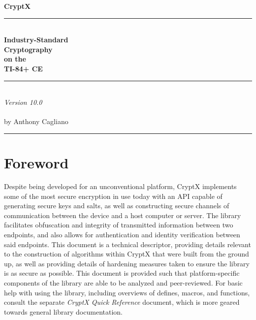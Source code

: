 \documentclass[titlepage]{article}
\begin{document}
	
			\begin{titlepage}
			\begin{center}
				\vspace*{2in}
				{\Large\textbf{CryptX}}
				\\\rule{.5\linewidth}{4px}\\
				{\huge\textbf{Industry-Standard\\Cryptography\\on the\\\vspace{4mm}TI-84+ CE}}
				\\\rule{.5\linewidth}{4px}\\\vspace{4mm}
				{\large\textit{Version 10.0}}\\\vspace{4mm}{\Large Analysis \& Extended Information}\\
				\vspace*{2in}
				by Anthony Cagliano
			\end{center}
		\end{titlepage}
	\setcounter{secnumdepth}{2}
	\setcounter{tocdepth}{2}
	\tableofcontents
	\begin{center}
		\rule{1\linewidth}{2px}
	\end{center}
	\section*{Foreword}
		Despite being developed for an unconventional platform, CryptX implements some of the most secure encryption in use today with an API capable of generating secure keys and salts, as well as constructing secure channels of communication between the device and a host computer or server. The library facilitates obfuscation and integrity of transmitted information between two endpoints, and also allows for authentication and identity verification between said endpoints. This document is a technical descriptor, providing details relevant to the construction of algorithms within CryptX that were built from the ground up, as well as providing details of hardening measures taken to ensure the library is as secure as possible. This document is provided such that platform-specific components of the library are able to be analyzed and peer-reviewed. For basic help with using the library, including overviews of defines, macros, and functions, consult the separate \textit{CryptX Quick Reference} document, which is more geared towards general library documentation.
		
\end{document}
